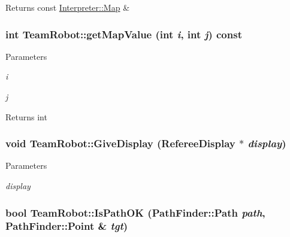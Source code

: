 \label{classTeamRobot_a8b5fa0d9f42166fc3339ec901fad5a91}
\begin{DoxyReturn}{Returns}
const \hyperlink{classInterpreter_a4c080f069f557cf92dfe803117a6ea53}{Interpreter::Map} \& 
\end{DoxyReturn}
\hypertarget{classTeamRobot_abc3a5d2d4cac44629a9d8851164b5eda}{
\subsubsection[{getMapValue}]{\setlength{\rightskip}{0pt plus 5cm}int TeamRobot::getMapValue (int {\em i}, \/  int {\em j}) const}}
\label{classTeamRobot_abc3a5d2d4cac44629a9d8851164b5eda}

\begin{DoxyParams}{Parameters}
\item[{\em i}]\item[{\em j}]\end{DoxyParams}
\begin{DoxyReturn}{Returns}
int 
\end{DoxyReturn}
\hypertarget{classTeamRobot_a2caa2411b9972fa5caa595f568394ba0}{
\subsubsection[{GiveDisplay}]{\setlength{\rightskip}{0pt plus 5cm}void TeamRobot::GiveDisplay ({\bf RefereeDisplay} $\ast$ {\em display})}}
\label{classTeamRobot_a2caa2411b9972fa5caa595f568394ba0}

\begin{DoxyParams}{Parameters}
\item[{\em display}]\end{DoxyParams}
\hypertarget{classTeamRobot_afb5f9191ca185053af37c1ae1f8dcb17}{
\subsubsection[{IsPathOK}]{\setlength{\rightskip}{0pt plus 5cm}bool TeamRobot::IsPathOK ({\bf PathFinder::Path} {\em path}, \/  {\bf PathFinder::Point} \& {\em tgt})}}
\label{classTeamRobot_afb5f9191ca185053af37c1ae1f8dcb17}

